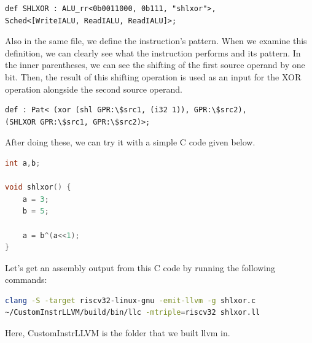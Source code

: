 \begin{lstlisting}
def SHLXOR : ALU_rr<0b0011000, 0b111, "shlxor">,
Sched<[WriteIALU, ReadIALU, ReadIALU]>;
\end{lstlisting}

Also in the same file, we define the instruction’s pattern. When we examine this definition, we can clearly see what the instruction performs and its pattern. In the inner parentheses, we can see the shifting of the first source operand by one bit. Then, the result of this shifting operation is used as an input for the XOR operation alongside the second source operand.

\begin{lstlisting}
def : Pat< (xor (shl GPR:\$src1, (i32 1)), GPR:\$src2),
(SHLXOR GPR:\$src1, GPR:\$src2)>;
\end{lstlisting}

After doing these, we can try it with a simple C code given below. 

\begin{lstlisting}[language=C++]
int a,b;

void shlxor() {
	a = 3;
	b = 5;
		
	a = b^(a<<1);
}
\end{lstlisting}

Let’s get an assembly output from this C code by running the following commands:

\begin{lstlisting}[language=Bash]
clang -S -target riscv32-linux-gnu -emit-llvm -g shlxor.c
~/CustomInstrLLVM/build/bin/llc -mtriple=riscv32 shlxor.ll
\end{lstlisting}

Here, CustomInstrLLVM is the folder that we built llvm in.

